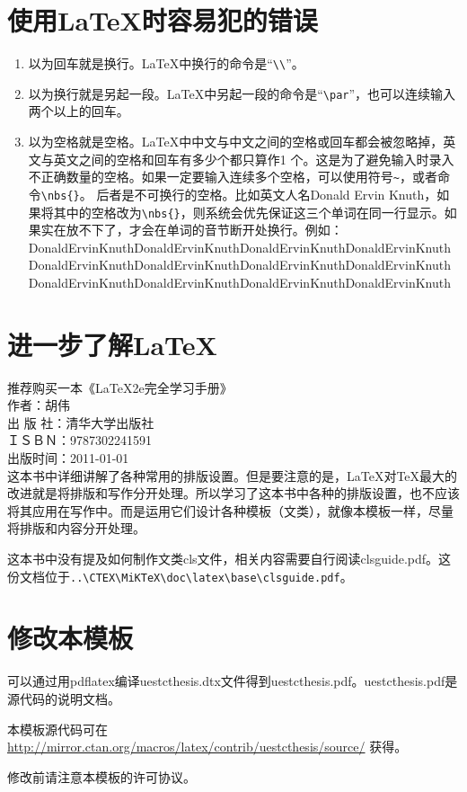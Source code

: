 \section{使用\LaTeX{}时容易犯的错误}
\begin{enumerate}
\item 以为回车就是换行。\LaTeX{}中换行的命令是“\verb|\\|”。
\item 以为换行就是另起一段。\LaTeX{}中另起一段的命令是“\verb|\par|”，也可以连续输入两个以上的回车。
\item 以为空格就是空格。\LaTeX{}中中文与中文之间的空格或回车都会被忽略掉，英文与英文之间的空格和回车有多少个都只算作1 个。这是为了避免输入时录入不正确数量的空格。如果一定要输入连续多个空格，可以使用符号\verb|~|，或者命令\verb|\nbs{}|。 后者是不可换行的空格。比如英文人名Donald Ervin Knuth，如果将其中的空格改为\verb|\nbs{}|，则系统会优先保证这三个单词在同一行显示。如果实在放不下了，才会在单词的音节断开处换行。例如：
    Donald\nbs{}Ervin\nbs{}Knuth\nbs{}Donald\nbs{}Ervin\nbs{}Knuth\nbs{}Donald\nbs{}Ervin\nbs{}Knuth\nbs{}Donald\nbs{}Ervin\nbs{}Knuth\nbs{}Donald\nbs{}Ervin\nbs{}Knuth\nbs{}Donald\nbs{}Ervin\nbs{}Knuth\nbs{}Donald\nbs{}Ervin\nbs{}Knuth\nbs{}Donald\nbs{}Ervin\nbs{}Knuth\nbs{}Donald\nbs{}Ervin\nbs{}Knuth\nbs{}Donald\nbs{}Ervin\nbs{}Knuth\nbs{}Donald\nbs{}Ervin\nbs{}Knuth\nbs{}Donald\nbs{}Ervin\nbs{}Knuth\nbs{}
\end{enumerate}

\section{进一步了解\LaTeX}
推荐购买一本《LaTeX2e完全学习手册》\\
作者：胡伟\\
出 版 社：清华大学出版社\\
ＩＳＢＮ：9787302241591 \\
出版时间：2011-01-01\\

这本书中详细讲解了各种常用的排版设置。但是要注意的是，\LaTeX{}对\TeX{}最大的改进就是将排版和写作分开处理。所以学习了这本书中各种的排版设置，也不应该将其应用在写作中。而是运用它们设计各种模板（文类），就像本模板一样，尽量将排版和内容分开处理。

这本书中没有提及如何制作文类cls文件，相关内容需要自行阅读clsguide.pdf。这份文档位于\verb|..\CTEX\MiKTeX\doc\latex\base\clsguide.pdf|。

\section{修改本模板}
可以通过用pdflatex编译uestcthesis.dtx文件得到uestcthesis.pdf。uestcthesis.pdf是源代码的说明文档。

本模板源代码可在\url{http://mirror.ctan.org/macros/latex/contrib/uestcthesis/source/} 获得。

修改前请注意本模板的许可协议。

